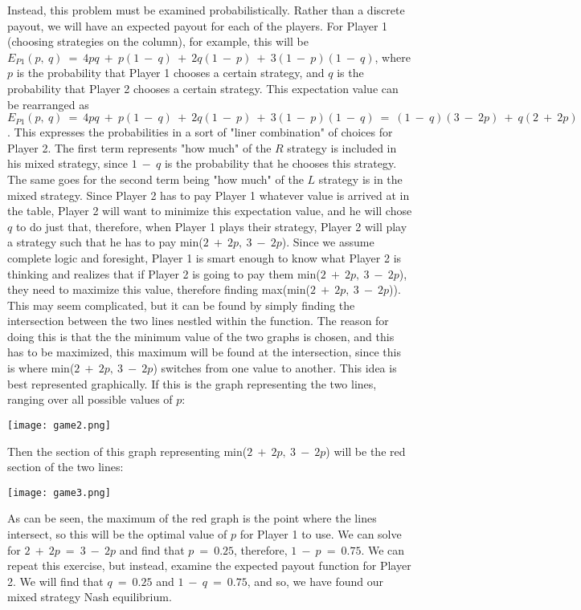 \documentclass{article}
\begin{document}
Instead, this problem must be examined probabilistically. Rather than a discrete payout, we will have an expected payout for each of the players. For Player 1 (choosing strategies on the column), for example, this will be $E_{P1}(p, \ q) \ = \ 4pq \ + \ p(1 \ - \ q) \ + \ 2q(1 \ - \ p) \ + \ 3(1 \ - \ p)(1 \ - \ q)$, where $p$ is the probability that Player 1 chooses a certain strategy, and $q$ is the  probability that Player 2 chooses a certain strategy. This expectation value can be rearranged as $E_{P1}(p, \ q) \ = \ 4pq \ + \ p(1 \ - \ q) \ + \ 2q(1 \ - \ p) \ + \ 3(1 \ - \ p)(1 \ - \ q) \ = \ (1 \ - \ q)(3 \ - \ 2p) \ + \ q(2 \ + \ 2p)$. This expresses the probabilities in a sort of "liner combination" of choices for Player 2. The first term represents "how much" of the $R$ strategy is included in his mixed strategy, since $1 \ - \ q$ is the probability that he chooses this strategy. The same goes for the second term being "how much" of the $L$ strategy is in the mixed strategy. Since Player 2 has to pay Player 1 whatever value is arrived at in the table, Player 2 will want to minimize this expectation value, and he will chose $q$ to do just that, therefore, when Player 1 plays their strategy, Player 2 will play a strategy such that he has to pay min($2 \ + \ 2p, \ 3 \ - \ 2p$).
\newline\newline
Since we assume complete logic and foresight, Player 1 is smart enough to know what Player 2 is thinking and realizes that if Player 2 is going to pay them min($2 \ + \ 2p, \ 3 \ - \ 2p$), they need to maximize this value, therefore finding max(min($2 \ + \ 2p, \ 3 \ - \ 2p$)). This may seem complicated, but it can be found by simply finding the intersection between the two lines nestled within the function. The reason for doing this is that the the minimum value of the two graphs is chosen, and this has to be maximized, this maximum will be found at the intersection, since this is where min($2 \ + \ 2p, \ 3 \ - \ 2p$) switches from one value to another. This idea is best represented graphically. If this is the graph representing the two lines, ranging over all possible values of $p$:
\begin{center}
\texttt{[image: game2.png]}
\end{center}
Then the section of this graph representing min($2 \ + \ 2p, \ 3 \ - \ 2p$) will be the red section of the two lines:
\begin{center}
\texttt{[image: game3.png]}
\end{center}
As can be seen, the maximum of the red graph is the point where the lines intersect, so this will be the optimal value of $p$ for Player 1 to use. We can solve for $2 \ + \ 2p \ = \ 3 \ - \ 2p$ and find that $p \ = \ 0.25$, therefore, $1 \ - \ p \ = \ 0.75$. We can repeat this exercise, but instead, examine the expected payout function for Player 2. We will find that $q \ = \ 0.25$ and $1 \ - \ q \ = \ 0.75$, and so, we have found our mixed strategy Nash equilibrium.
\end{document}
